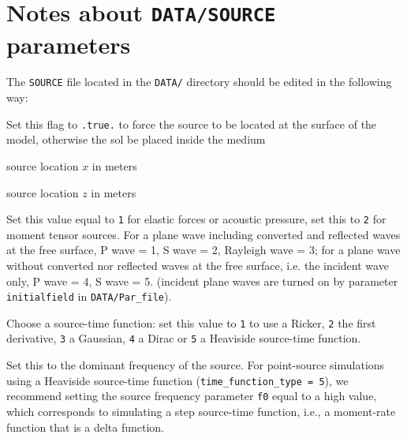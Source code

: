 \documentclass[oneside,english,onecolumn,letterpaper]{book}
\begin{document}
\section*{Notes about \texttt{DATA/SOURCE} parameters}


The \texttt{SOURCE} file located in the \texttt{DATA/} directory should be edited in the following way:
%
\begin{description}[font=\ttfamily]
\item[source\_surf] Set this flag to \texttt{.true.} to force the source to be located at the surface of the model, otherwise
the sol be placed inside the medium

\item[xs] source location $x$ in meters

\item[zs] source location $z$ in meters

\item[source\_type] Set this value equal to \texttt{1} for elastic forces or acoustic pressure,
set this to \texttt{2} for moment tensor sources.
For a plane wave including converted and reflected waves at the free surface, P wave = 1, S wave = 2, Rayleigh wave = 3;
for a plane wave without converted nor reflected waves at the free surface, i.e. the incident wave only, P wave = 4, S wave = 5.
(incident plane waves are turned on by parameter \texttt{initialfield} in \texttt{DATA/Par\_file}).

\item[time\_function\_type] Choose a source-time function: set this value to \texttt{1} to use a Ricker,
\texttt{2} the first derivative, \texttt{3} a Gaussian, \texttt{4} a Dirac or \texttt{5} a Heaviside source-time function.

\item[f0] Set this to the dominant frequency of the source.
For point-source simulations using a Heaviside source-time function (\texttt{time\_function\_type = 5}),
we recommend setting the source frequency parameter \texttt{f0}
equal to a high value, which corresponds to simulating a step source-time
function, i.e., a moment-rate function that is a delta function.


\end{description}
\end{document}
